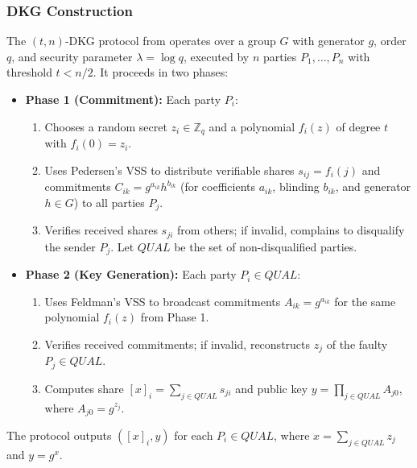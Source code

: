 \subsubsection{DKG Construction}
The $(t,n)$-DKG protocol from \cite{Gennaro2007} operates over a group $G$ with generator $g$, order $q$, and security parameter $\lambda = \log q$, executed by $n$ parties $P_1, \dots, P_n$ with threshold $t < n/2$. It proceeds in two phases:
\begin{itemize}
    \item \textbf{Phase 1 (Commitment):} Each party $P_i$:
        \begin{enumerate}
            \item Chooses a random secret $z_i \in \mathbb{Z}_q$ and a polynomial $f_i(z)$ of degree $t$ with $f_i(0) = z_i$.
            \item Uses Pedersen’s VSS to distribute verifiable shares $s_{ij} = f_i(j)$ and commitments $C_{ik} = g^{a_{ik}} h^{b_{ik}}$ (for coefficients $a_{ik}$, blinding $b_{ik}$, and generator $h \in G$) to all parties $P_j$.
            \item Verifies received shares $s_{ji}$ from others; if invalid, complains to disqualify the sender $P_j$. Let $QUAL$ be the set of non-disqualified parties.
        \end{enumerate}
    \item \textbf{Phase 2 (Key Generation):} Each party $P_i \in QUAL$:
        \begin{enumerate}
            \item Uses Feldman’s VSS to broadcast commitments $A_{ik} = g^{a_{ik}}$ for the same polynomial $f_i(z)$ from Phase 1.
            \item Verifies received commitments; if invalid, reconstructs $z_j$ of the faulty $P_j \in QUAL$.
            \item Computes share $[x]_i = \sum_{j \in QUAL} s_{ji}$ and public key $y = \prod_{j \in QUAL} A_{j0}$, where $A_{j0} = g^{z_j}$.
        \end{enumerate}
\end{itemize}
The protocol outputs $([x]_i, y)$ for each $P_i \in QUAL$, where $x = \sum_{j \in QUAL} z_j$ and $y = g^x$.


















